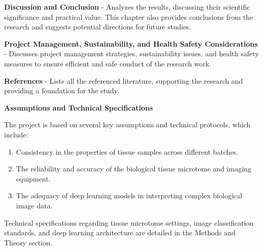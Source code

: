 \textbf{Discussion and Conclusion} - Analyzes the results, discussing their scientific significance and practical value. This chapter also provides conclusions from the research and suggests potential directions for future studies.

\textbf{Project Management, Sustainability, and Health Safety Considerations} - Discusses project management strategies, sustainability issues, and health safety measures to ensure efficient and safe conduct of the research work.

\textbf{References} - Lists all the referenced literature, supporting the research and providing a foundation for the study.



\textbf{Assumptions and Technical Specifications}

The project is based on several key assumptions and technical protocols, which include:

\begin{enumerate}
    \item Consistency in the properties of tissue samples across different batches.
    \item The reliability and accuracy of the biological tissue microtome and imaging equipment.
    \item The adequacy of deep learning models in interpreting complex biological image data.
\end{enumerate}

Technical specifications regarding tissue microtome settings, image classification standards, and deep learning architecture are detailed in the Methods and Theory section.
